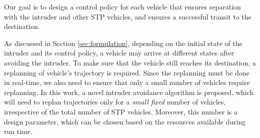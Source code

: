 Our goal is to design a control policy for each vehicle that ensures separation with the intruder and other STP vehicles, and ensures a successful transit to the destination. %

As discussed in Section \ref{sec:formulation}, depending on the initial state of the intruder and its control policy, a vehicle may arrive at different states after avoiding the intruder. To make sure that the vehicle still reaches its destination, a replanning of vehicle's trajectory is required. Since the replanning must be done in real-time, we also need to ensure that only a small number of vehicles require replanning. In this work, a novel intruder avoidance algorithm is proposed, which will need to replan trajectories only for a \textit{small fixed} number of vehicles, irrespective of the total number of STP vehicles. Moreover, this number is a design parameter, which can be chosen based on the resources available during run time. 

